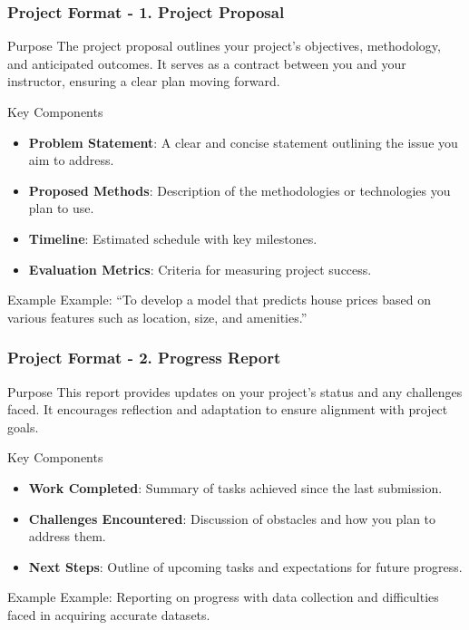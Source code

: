 \documentclass[aspectratio=169]{beamer}
\begin{document}
\begin{frame}[fragile]
    \frametitle{Project Format - 1. Project Proposal}
    \begin{block}{Purpose}
        The project proposal outlines your project's objectives, methodology, and anticipated outcomes. It serves as a contract between you and your instructor, ensuring a clear plan moving forward.
    \end{block}
    
    \begin{block}{Key Components}
        \begin{itemize}
            \item \textbf{Problem Statement}: A clear and concise statement outlining the issue you aim to address.
            \item \textbf{Proposed Methods}: Description of the methodologies or technologies you plan to use.
            \item \textbf{Timeline}: Estimated schedule with key milestones.
            \item \textbf{Evaluation Metrics}: Criteria for measuring project success.
        \end{itemize}
    \end{block}
    
    \begin{block}{Example}
        Example: “To develop a model that predicts house prices based on various features such as location, size, and amenities.”
    \end{block}
\end{frame}

\begin{frame}[fragile]
    \frametitle{Project Format - 2. Progress Report}
    \begin{block}{Purpose}
        This report provides updates on your project's status and any challenges faced. It encourages reflection and adaptation to ensure alignment with project goals.
    \end{block}
    
    \begin{block}{Key Components}
        \begin{itemize}
            \item \textbf{Work Completed}: Summary of tasks achieved since the last submission.
            \item \textbf{Challenges Encountered}: Discussion of obstacles and how you plan to address them.
            \item \textbf{Next Steps}: Outline of upcoming tasks and expectations for future progress.
        \end{itemize}
    \end{block}
    
    \begin{block}{Example}
        Example: Reporting on progress with data collection and difficulties faced in acquiring accurate datasets.
    \end{block}
\end{frame}
\end{document}
